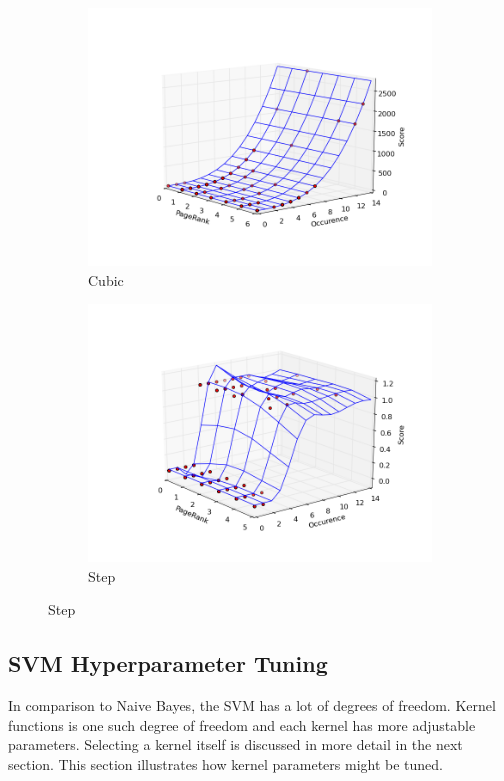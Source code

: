 \documentclass[12pt,notitlepage,twoside]{scrreprt}
\begin{document}
\begin{figure}[h!]
\begin{subfigure}[b]{.49\textwidth}
  \centering
  \includegraphics[width=\linewidth]{figs/cub.png}
  \caption{Cubic}
  \label{cubic}
\end{subfigure}
\begin{subfigure}[b]{.49\textwidth}
  \centering
  \includegraphics[width=\linewidth]{figs/step.png}
  \caption{Step}
  \label{step}
\end{subfigure}
\end{figure}

\subsection{SVM Hyperparameter Tuning}
In comparison to Naive Bayes, the SVM has a lot of degrees of freedom. Kernel functions is
one such degree of freedom and each kernel has more adjustable parameters. Selecting a kernel 
itself is discussed in more detail in the next section. This section illustrates how
kernel parameters might be tuned. 
\end{document}
